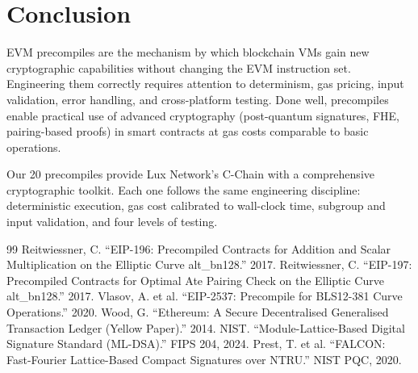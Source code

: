 \documentclass[11pt,a4paper]{article}
\begin{document}
\section{Conclusion}

EVM precompiles are the mechanism by which blockchain VMs gain new cryptographic
capabilities without changing the EVM instruction set. Engineering them correctly requires
attention to determinism, gas pricing, input validation, error handling, and
cross-platform testing. Done well, precompiles enable practical use of advanced
cryptography (post-quantum signatures, FHE, pairing-based proofs) in smart contracts
at gas costs comparable to basic operations.

Our 20 precompiles provide Lux Network's C-Chain with a comprehensive cryptographic
toolkit. Each one follows the same engineering discipline: deterministic execution,
gas cost calibrated to wall-clock time, subgroup and input validation, and four levels
of testing.

\begin{thebibliography}{99}
 Reitwiessner, C. ``EIP-196: Precompiled Contracts for Addition and Scalar Multiplication on the Elliptic Curve alt\_bn128.'' 2017.
 Reitwiessner, C. ``EIP-197: Precompiled Contracts for Optimal Ate Pairing Check on the Elliptic Curve alt\_bn128.'' 2017.
 Vlasov, A. et al. ``EIP-2537: Precompile for BLS12-381 Curve Operations.'' 2020.
 Wood, G. ``Ethereum: A Secure Decentralised Generalised Transaction Ledger (Yellow Paper).'' 2014.
 NIST. ``Module-Lattice-Based Digital Signature Standard (ML-DSA).'' FIPS 204, 2024.
 Prest, T. et al. ``FALCON: Fast-Fourier Lattice-Based Compact Signatures over NTRU.'' NIST PQC, 2020.
\end{thebibliography}
\end{document}
